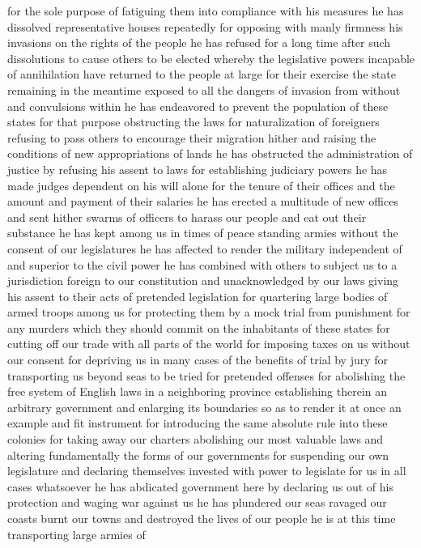 for the sole purpose of fatiguing them into compliance with his measures
he has dissolved representative houses repeatedly for opposing with
manly firmness his invasions on the rights of the people he has refused
for a long time after such dissolutions to cause others to be elected
whereby the legislative powers incapable of annihilation have returned
to the people at large for their exercise the state remaining in the
meantime exposed to all the dangers of invasion from without and
convulsions within he has endeavored to prevent the population of these
states for that purpose obstructing the laws for naturalization of
foreigners refusing to pass others to encourage their migration hither
and raising the conditions of new appropriations of lands he has
obstructed the administration of justice by refusing his assent to laws
for establishing judiciary powers he has made judges dependent on his
will alone for the tenure of their offices and the amount and payment of
their salaries he has erected a multitude of new offices and sent hither
swarms of officers to harass our people and eat out their substance he
has kept among us in times of peace standing armies without the consent
of our legislatures he has affected to render the military independent
of and superior to the civil power he has combined with others to
subject us to a jurisdiction foreign to our constitution and
unacknowledged by our laws giving his assent to their acts of pretended
legislation for quartering large bodies of armed troops among us for
protecting them by a mock trial from punishment for any murders which
they should commit on the inhabitants of these states for cutting off
our trade with all parts of the world for imposing taxes on us without
our consent for depriving us in many cases of the benefits of trial by
jury for transporting us beyond seas to be tried for pretended offenses
for abolishing the free system of English laws in a neighboring province
establishing therein an arbitrary government and enlarging its
boundaries so as to render it at once an example and fit instrument for
introducing the same absolute rule into these colonies for taking away
our charters abolishing our most valuable laws and altering
fundamentally the forms of our governments for suspending our own
legislature and declaring themselves invested with power to legislate
for us in all cases whatsoever he has abdicated government here by
declaring us out of his protection and waging war against us he has
plundered our seas ravaged our coasts burnt our towns and destroyed the
lives of our people he is at this time transporting large armies of

